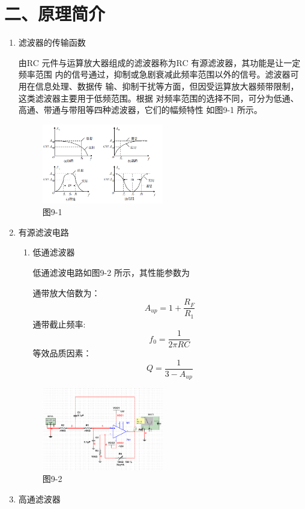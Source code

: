\documentclass[a4paper,10pt,notitlepage]{article}
\begin{document}
	\section*{二、原理简介}
	\begin{enumerate}
	\item 滤波器的传输函数\par 
	\qquad 由RC 元件与运算放大器组成的滤波器称为RC 有源滤波器，其功能是让一定频率范围
	内的信号通过，抑制或急剧衰减此频率范围以外的信号。滤波器可用在信息处理、数据传
	输、抑制干扰等方面，但因受运算放大器频带限制，这类滤波器主要用于低频范围。根据
	对频率范围的选择不同，可分为低通、高通、带通与带阻等四种滤波器，它们的幅频特性
	如图9-1 所示。
	\begin{figure}[h]
		\centering
		\includegraphics[width=0.5\textwidth]{1.png}
		\caption*{图9-1}
	\end{figure}
	\item 有源滤波电路
	\begin{enumerate}
		\item 低通滤波器 \par 
		低通滤波电路如图9-2 所示，其性能参数为\par 
		通带放大倍数为：
		$$A_{up}=1+\frac{R_F}{R_1}$$
		通带截止频率:
		$$f_0=\frac{1}{2\pi RC}$$
		等效品质因素：
		$$Q=\frac{1}{3-A_{up}}$$
	\end{enumerate}
	\begin{figure}[h]
		\centering
		\includegraphics[width=0.5\textwidth]{2.png}
		\caption*{图9-2}
	\end{figure}
	\item 高通滤波器\par 

\end{enumerate}
\end{document}
